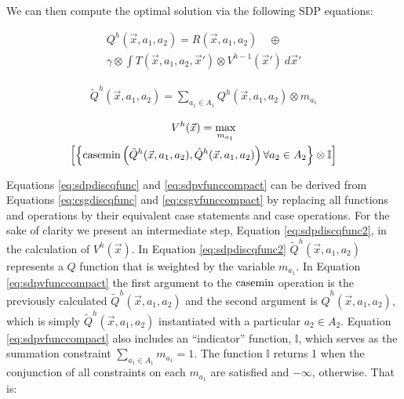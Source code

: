 We can then compute the optimal solution via the following SDP equations:

{\footnotesize 
\abovedisplayskip=0pt
\belowdisplayskip=0pt
\begin{multline}
\label{eq:sdpdiscqfunc}
  Q^{h}(\vec{x}, a_1, a_2) = R(\vec{x}, a_1, a_2) \quad \oplus \\
  \gamma \otimes \int T(\vec{x}, a_1, a_2, \vec{x}') \otimes V^{h-1}(\vec{x}')\ d\vec{x}' 
\end{multline}
}%

{\footnotesize 
\abovedisplayskip=0pt
\belowdisplayskip=0pt
\begin{multline}
\label{eq:sdpdiscqfunc2}
  \tilde{Q}^{h}(\vec{x}, a_1, a_2) = \sum_{a_1 \in A_1} Q^{h}(\vec{x}, a_1, a_2) \otimes m_{a_{1}}
\end{multline}
}%

{\footnotesize 
\abovedisplayskip=0pt
\belowdisplayskip=0pt
\begin{multline}
\label{eq:sdpvfunccompact}
  V^{h}(\vec{x}) = \max_{m_{a_1}} \\ \left[ \left\{ \mathrm{casemin} \left( \tilde{Q}^{h}(\vec{x}, a_1, a_2),  \hat{Q}^{h}(\vec{x}, a_1, a_2) \right)  \forall a_2 \in A_2 \right\} \otimes \mathbb{I} \right]
\end{multline}
}%

Equations \eqref{eq:sdpdiscqfunc} and \eqref{eq:sdpvfunccompact} can
be derived from Equations \eqref{eq:csgdiscqfunc} and \eqref{eq:csgvfunccompact}
by replacing all functions and operations by their equivalent case
statements and case operations. For the sake of clarity we present
an intermediate step, Equation \eqref{eq:sdpdiscqfunc2}, in the calculation
of $V^{h}(\vec{x})$. In Equation \eqref{eq:sdpdiscqfunc2} 
$\tilde{Q}^{h}(\vec{x}, a_1, a_2)$ represents a $Q$ function that is 
weighted by the variable $m_{a_{1}}$. In Equation \eqref{eq:sdpvfunccompact} the first argument to the $\mathrm{casemin}$
operation is the previously calculated $\tilde{Q}^{h}(\vec{x}, a_1, a_2)$ and
the second argument is $\hat{Q}^{h}(\vec{x}, a_1, a_2)$, which is simply
$\tilde{Q}^{h}(\vec{x}, a_1, a_2)$ instantiated with a particular $a_2 \in A_2$.
Equation \eqref{eq:sdpvfunccompact} 
also includes an ``indicator'' function, $\mathbb{I}$, which serves as the summation constraint 
$\sum_{a_{1} \in A_1} m_{a_{1}} = 1$. The function $\mathbb{I}$
returns 1 when the conjunction of all constraints on each $m_{a_1}$ are satisfied
and $-\infty$, otherwise. That is:

